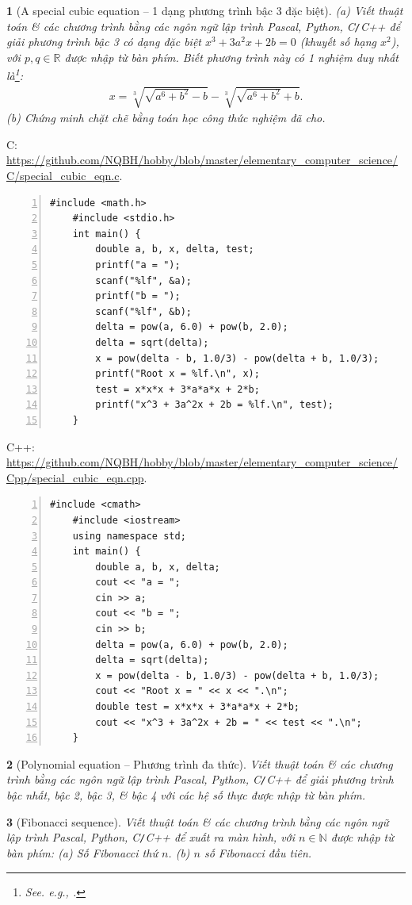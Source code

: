 \documentclass{article}
\newtheorem{baitoan}{}
\begin{document}
\begin{baitoan}[A special cubic equation -- 1 dạng phương trình bậc 3 đặc biệt]
	(a) Viết thuật toán \& các chương trình bằng các ngôn ngữ lập trình {\sf Pascal, Python, C{\tt/}C++} để giải phương trình bậc 3 có dạng đặc biệt $x^3 + 3a^2x + 2b = 0$ (khuyết số hạng $x^2$), với $p,q\in\mathbb{R}$ được nhập từ bàn phím. Biết phương trình này có 1 nghiệm duy nhất là\footnote{See. e.g., \cite[pp. 68--69]{Thu_Phuong_Tien_Triet_NMLT}.}:
	\begin{align*}
		x = \sqrt[3]{\sqrt{a^6 + b^2} - b} - \sqrt[3]{\sqrt{a^6 + b^2} + b}.
	\end{align*}
	(b) Chứng minh chặt chẽ bằng toán học công thức nghiệm đã cho.
\end{baitoan}
C: \url{https://github.com/NQBH/hobby/blob/master/elementary_computer_science/C/special_cubic_eqn.c}.
\begin{Verbatim}[numbers=left,xleftmargin=5mm]
	#include <math.h>
	#include <stdio.h>
	int main() {
		double a, b, x, delta, test;
		printf("a = ");
		scanf("%lf", &a);
		printf("b = ");
		scanf("%lf", &b);
		delta = pow(a, 6.0) + pow(b, 2.0);
		delta = sqrt(delta);
		x = pow(delta - b, 1.0/3) - pow(delta + b, 1.0/3);
		printf("Root x = %lf.\n", x);
		test = x*x*x + 3*a*a*x + 2*b;
		printf("x^3 + 3a^2x + 2b = %lf.\n", test);
	}
\end{Verbatim}
C++: \url{https://github.com/NQBH/hobby/blob/master/elementary_computer_science/Cpp/special_cubic_eqn.cpp}.
\begin{Verbatim}[numbers=left,xleftmargin=5mm]
	#include <cmath>
	#include <iostream>
	using namespace std;
	int main() {
		double a, b, x, delta;
		cout << "a = ";
		cin >> a;
		cout << "b = ";
		cin >> b;
		delta = pow(a, 6.0) + pow(b, 2.0);
		delta = sqrt(delta);
		x = pow(delta - b, 1.0/3) - pow(delta + b, 1.0/3);
		cout << "Root x = " << x << ".\n";
		double test = x*x*x + 3*a*a*x + 2*b;
		cout << "x^3 + 3a^2x + 2b = " << test << ".\n";
	}
\end{Verbatim}

\begin{baitoan}[Polynomial equation -- Phương trình đa thức]
	Viết thuật toán \& các chương trình bằng các ngôn ngữ lập trình {\sf Pascal, Python, C{\tt/}C++} để giải phương trình bậc nhất, bậc 2, bậc 3, \& bậc 4 với các hệ số thực được nhập từ bàn phím.
\end{baitoan}

\begin{baitoan}[Fibonacci sequence]
	Viết thuật toán \& các chương trình bằng các ngôn ngữ lập trình {\sf Pascal, Python, C{\tt/}C++} để xuất ra màn hình, với $n\in\mathbb{N}$ được nhập từ bàn phím: (a) Số Fibonacci thứ $n$. (b) $n$ số Fibonacci đầu tiên.
\end{baitoan}
\end{document}
